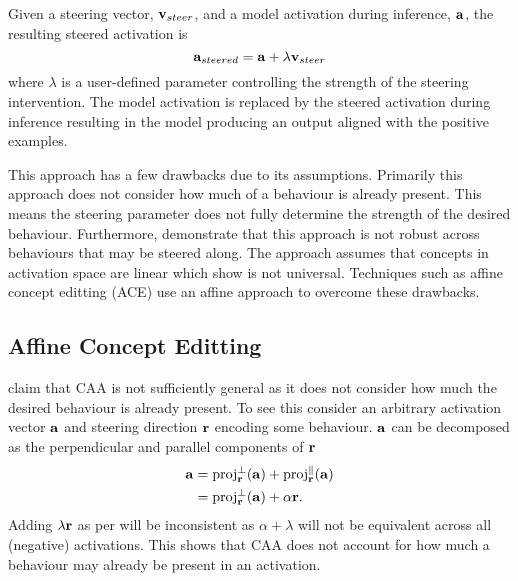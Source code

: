 Given a steering vector, $\mathbf{v}_{steer}$, and a model activation during inference, $\mathbf{a}$, the resulting steered activation is
\begin{equation}
    \label{eq:caa}
    \mathbf{a}_{steered} = \mathbf{a} + \lambda\mathbf{v}_{steer}
\end{equation}
where $\lambda$ is a user-defined parameter controlling the strength of the steering intervention.
The model activation is replaced by the steered activation during inference resulting in the model producing an output aligned with the positive examples.

This approach has a few drawbacks \citep{steerability, ace, non-linear-features} due to its assumptions.
Primarily this approach does not consider how much of a behaviour is already present.
This means the steering parameter does not fully determine the strength of the desired behaviour.
Furthermore, \citet{steerability} demonstrate that this approach is not robust across behaviours that may be steered along.
The approach assumes that concepts in activation space are linear which \citet{non-linear-features} show is not universal.
Techniques such as affine concept editting (ACE)  use an affine approach to overcome these drawbacks.

\subsection{Affine Concept Editting}
\label{sec:ace}

\citet{ace} claim that CAA \citep{caa} is not sufficiently general as it does not consider how much the desired behaviour is already present.
To see this consider an arbitrary activation vector $\mathbf{a}$ and steering direction $\mathbf{r}$ encoding some behaviour.
$\mathbf{a}$ can be decomposed as the perpendicular and parallel components of $\mathbf{r}$
\begin{equation}
    \label{eq:components}
    \begin{aligned}
        \mathbf{a} &= \text{proj}_{\mathbf{r}}^{\perp}(\mathbf{a}) + \text{proj}_{\mathbf{r}}^{\parallel}(\mathbf{a}) \\
            &= \text{proj}_{\mathbf{r}}^{\perp}(\mathbf{a}) + \alpha\mathbf{r}.
    \end{aligned}
\end{equation}
Adding $\lambda\mathbf{r}$ as per  will be inconsistent as $\alpha + \lambda$ will not be equivalent across all (negative) activations.
This shows that CAA \citep{caa} does not account for how much a behaviour may already be present in an activation.

